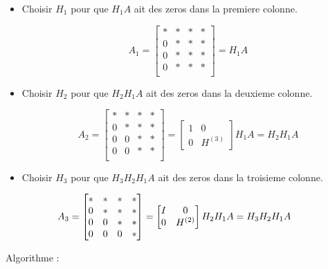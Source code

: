 
\begin{itemize}
    \item Choisir $H_1$ pour que $H_1A$ ait des zeros dans la premiere colonne. 
    
$$
A_1 = \begin{bmatrix}
    * & * & * & * \\
    0& * & * & * \\
    0& * & * & * \\
    0& * & * & * \\
\end{bmatrix} = H_1A
$$
    \item Choisir $H_2$ pour que $H_2H_1A$ ait des zeros dans la deuxieme colonne.

\[
A_2 = \begin{bmatrix}
    * & * & * & * \\
    0& * & * & * \\
    0& 0 & * & * \\
    0& 0 & * & * \\
\end{bmatrix} = 
\begin{bmatrix}
1 & 0 \\
0 & H^{(3)}
\end{bmatrix} 
                H_1 A =H_2H_1A
\]

    \item Choisir $H_3$ pour que $H_3H_2H_1A$ ait des zeros dans la troisieme colonne.

\[
    \hspace{-1cm}
A_3 = \begin{bmatrix}
    * & * & * & * \\
    0& * & * & * \\
    0& 0 & * & * \\
    0& 0 & 0 & * \\
\end{bmatrix} = 
\begin{bmatrix}
I &  0 \\
0 & H^{(2)}
\end{bmatrix} 
                H_2 H_1 A =H_3 H_2 H_1 A
\]
\end{itemize}

Algorithme :

